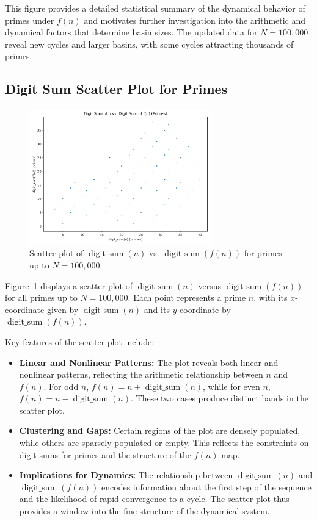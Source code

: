 \documentclass[12pt]{article}
\begin{document}
This figure provides a detailed statistical summary of the dynamical behavior of primes under $f(n)$ and motivates further investigation into the arithmetic and dynamical factors that determine basin sizes. The updated data for $N=100,000$ reveal new cycles and larger basins, with some cycles attracting thousands of primes.

\subsection{Digit Sum Scatter Plot for Primes}
\begin{figure}[H]
    \centering
    \includegraphics[width=0.7\textwidth]{fig_digit_sum_scatter_primes.png}
    \caption{Scatter plot of $\operatorname{digit\_sum}(n)$ vs. $\operatorname{digit\_sum}(f(n))$ for primes up to $N=100,000$.}
    \label{fig:digit_sum_scatter}
\end{figure}

Figure~\ref{fig:digit_sum_scatter} displays a scatter plot of $\operatorname{digit\_sum}(n)$ versus $\operatorname{digit\_sum}(f(n))$ for all primes up to $N=100,000$. Each point represents a prime $n$, with its $x$-coordinate given by $\operatorname{digit\_sum}(n)$ and its $y$-coordinate by $\operatorname{digit\_sum}(f(n))$.

Key features of the scatter plot include:
\begin{itemize}
    \item \textbf{Linear and Nonlinear Patterns:} The plot reveals both linear and nonlinear patterns, reflecting the arithmetic relationship between $n$ and $f(n)$. For odd $n$, $f(n) = n + \operatorname{digit\_sum}(n)$, while for even $n$, $f(n) = n - \operatorname{digit\_sum}(n)$. These two cases produce distinct bands in the scatter plot.
    \item \textbf{Clustering and Gaps:} Certain regions of the plot are densely populated, while others are sparsely populated or empty. This reflects the constraints on digit sums for primes and the structure of the $f(n)$ map.
    \item \textbf{Implications for Dynamics:} The relationship between $\operatorname{digit\_sum}(n)$ and $\operatorname{digit\_sum}(f(n))$ encodes information about the first step of the sequence and the likelihood of rapid convergence to a cycle. The scatter plot thus provides a window into the fine structure of the dynamical system.
\end{itemize}
\end{document}
